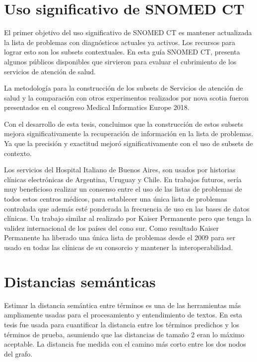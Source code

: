 \section{Uso significativo de SNOMED CT}
El primer objetivo del uso significativo de SNOMED CT es mantener actualizada la lista de problemas con diagnósticos actuales ya activos. Los recursos para lograr esto son los subsets contextuales. En esta guía SNOMED CT, presenta algunos públicos disponibles que sirvieron para evaluar el cubrimiento de los servicios de atención de salud.\cite{meaningfuluse}

La metodología para la construcción de los subsets de Servicios de atención de salud y la comparación con otros experimentos realizados por nova scotia\cite{nova} fueron presentados en el congreso Medical Informatics Europe 2018.\cite{Avila2018SelectionSubsets.}

Con el desarrollo de esta tesis, concluimos que la construcción de estos subsets mejora significativamente la recuperación de información en la lista de problemas. Ya que la precisión y exactitud mejoró significativamente con el uso de subsets de contexto.

Los servicios del Hospital Italiano de Buenos Aires, son usados por historias clínicas electrónicas de Argentina, Uruguay y Chile. En trabajos futuros, sería muy beneficioso realizar un consenso entre el uso de las listas de problemas de todos estos centros médicos, para establecer una única lista de problemas controlada que además esté ponderada la frecuencia de uso en las bases de datos clínicas. Un trabajo similar al realizado por Kaiser Permanente pero que tenga la validez internacional de los países del cono sur. Como resultado Kaiser Permanente ha liberado una única lista de problemas desde el 2009 para ser usado en todas las clínicas de su consorcio y mantener la interoperabilidad.\cite{Dolin2004KaiserTerminology.}

\section{Distancias semánticas}

Estimar la distancia semántica entre términos es una de las herramientas más ampliamente usadas para el procesamiento y entendimiento de textos. En esta tesis fue usada para cuantificar la distancia entre los términos predichos y los términos de prueba, asumiendo que las distancias de tamaño 2 eran lo máximo aceptable. La distancia fue medida con el camino más corto entre los dos nodos del grafo.

